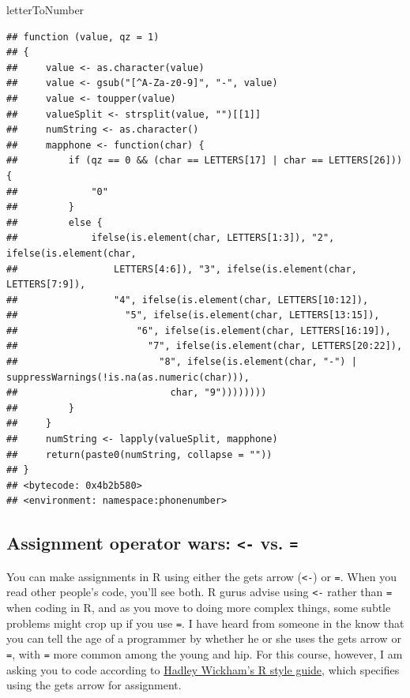 \documentclass[]{book}
\makeatletter
\newenvironment{Shaded}{\begin{snugshade}}{\end{snugshade}}
\newcommand{\NormalTok}[1]{#1}
\newenvironment{kframe}{%
\medskip{}
\setlength{\fboxsep}{.8em}
 \def\at@end@of@kframe{}%
 \ifinner\ifhmode%
  \def\at@end@of@kframe{\end{minipage}}%
  \begin{minipage}{\columnwidth}%
 \fi\fi%
 \def\FrameCommand##1{\hskip\@totalleftmargin \hskip-\fboxsep
 \colorbox{shadecolor}{##1}\hskip-\fboxsep
     \hskip-\linewidth \hskip-\@totalleftmargin \hskip\columnwidth}%
 \MakeFramed {\advance\hsize-\width
   \@totalleftmargin\z@ \linewidth\hsize
   \@setminipage}}%
 {\par\unskip\endMakeFramed%
 \at@end@of@kframe}
\renewenvironment{Shaded}{\begin{kframe}}{\end{kframe}}
\theoremstyle{definition}
\theoremstyle{definition}
\theoremstyle{definition}
\theoremstyle{remark}
\makeatother
\begin{document}
\begin{Shaded}
\begin{Highlighting}[]
\NormalTok{letterToNumber}
\end{Highlighting}
\end{Shaded}

\begin{verbatim}
## function (value, qz = 1) 
## {
##     value <- as.character(value)
##     value <- gsub("[^A-Za-z0-9]", "-", value)
##     value <- toupper(value)
##     valueSplit <- strsplit(value, "")[[1]]
##     numString <- as.character()
##     mapphone <- function(char) {
##         if (qz == 0 && (char == LETTERS[17] | char == LETTERS[26])) {
##             "0"
##         }
##         else {
##             ifelse(is.element(char, LETTERS[1:3]), "2", ifelse(is.element(char, 
##                 LETTERS[4:6]), "3", ifelse(is.element(char, LETTERS[7:9]), 
##                 "4", ifelse(is.element(char, LETTERS[10:12]), 
##                   "5", ifelse(is.element(char, LETTERS[13:15]), 
##                     "6", ifelse(is.element(char, LETTERS[16:19]), 
##                       "7", ifelse(is.element(char, LETTERS[20:22]), 
##                         "8", ifelse(is.element(char, "-") | suppressWarnings(!is.na(as.numeric(char))), 
##                           char, "9"))))))))
##         }
##     }
##     numString <- lapply(valueSplit, mapphone)
##     return(paste0(numString, collapse = ""))
## }
## <bytecode: 0x4b2b580>
## <environment: namespace:phonenumber>
\end{verbatim}

\subsection{\texorpdfstring{Assignment operator wars:
\texttt{\textless{}-} vs.
\texttt{=}}{Assignment operator wars: \textless{}- vs. =}}\label{assignment-operator-wars---vs.}

You can make assignments in R using either the gets arrow
(\texttt{\textless{}-}) or \texttt{=}. When you read other people's
code, you'll see both. R gurus advise using \texttt{\textless{}-} rather
than \texttt{=} when coding in R, and as you move to doing more complex
things, some subtle problems might crop up if you use \texttt{=}. I have
heard from someone in the know that you can tell the age of a programmer
by whether he or she uses the gets arrow or \texttt{=}, with \texttt{=}
more common among the young and hip. For this course, however, I am
asking you to code according to
\href{http://adv-r.had.co.nz/Style.html}{Hadley Wickham's R style
guide}, which specifies using the gets arrow for assignment.
\end{document}
